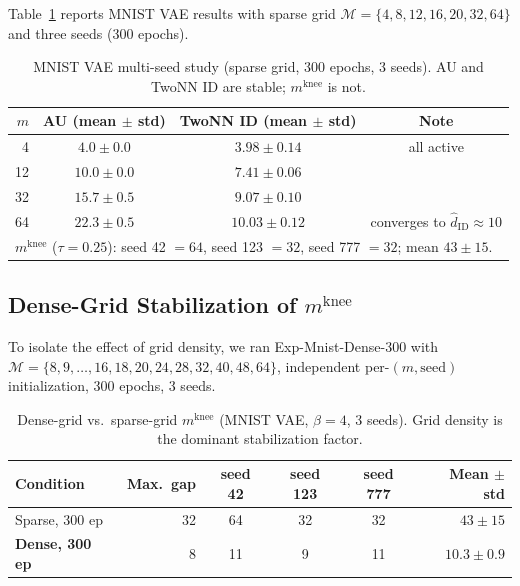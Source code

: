 \documentclass[make,article,submit,pdftex,moreauthors]{Definitions/mdpi}
\newcommand{\mknee}{m^{\mathrm{knee}}}
\newcommand{\hatdID}{\hat{d}_{\mathrm{ID}}}
\begin{document}
Table~\ref{tab:multiseed_300} reports MNIST VAE results with sparse grid
$\mathcal{M} = \{4, 8, 12, 16, 20, 32, 64\}$ and three seeds (300 epochs).

\begin{table}[H]
\caption{MNIST VAE multi-seed study (sparse grid, 300 epochs, 3 seeds).
AU and TwoNN ID are stable; $\mknee$ is not.}
\label{tab:multiseed_300}
\small
\begin{tabular}{rccc}
\toprule
$m$ & AU (mean $\pm$ std) & TwoNN ID (mean $\pm$ std) & Note \\
\midrule
4  & $4.0 \pm 0.0$ & $3.98 \pm 0.14$ & all active \\
12 & $10.0 \pm 0.0$ & $7.41 \pm 0.06$ & \\
32 & $15.7 \pm 0.5$ & $9.07 \pm 0.10$ & \\
64 & $22.3 \pm 0.5$ & $\mathbf{10.03 \pm 0.12}$ &
  converges to $\hatdID \approx 10$ \\
\midrule
\multicolumn{4}{l}{\small $\mknee$ ($\tau = 0.25$):
  seed 42 $= 64$, seed 123 $= 32$, seed 777 $= 32$; mean $43 \pm 15$.}\\
\bottomrule
\end{tabular}
\end{table}

\subsection{\texorpdfstring{Dense-Grid Stabilization of $\mknee$}
{Dense-Grid Stabilization of mknee}}\label{sec:exp_dense}

To isolate the effect of grid density, we ran Exp-Mnist-Dense-300 with
$\mathcal{M} = \{8, 9, \ldots, 16, 18, 20, 24, 28, 32, 40, 48, 64\}$,
independent per-$(m, \mathrm{seed})$ initialization, 300 epochs, 3 seeds.

\begin{table}[H]
\caption{Dense-grid vs.\ sparse-grid $\mknee$ (MNIST VAE, $\beta = 4$,
3 seeds). Grid density is the dominant stabilization factor.}
\label{tab:el_mknee}
\small
\begin{tabular}{lrcccr}
\toprule
Condition & Max.\ gap & seed 42 & seed 123 & seed 777 & Mean $\pm$ std \\
\midrule
Sparse, 300 ep & 32 & 64 & 32 & 32 & $43 \pm 15$ \\
\textbf{Dense, 300 ep} & 8 & 11 & 9  & 11 &
  $\boldsymbol{10.3 \pm 0.9}$ \\
\bottomrule
\end{tabular}
\end{table}
\end{document}
